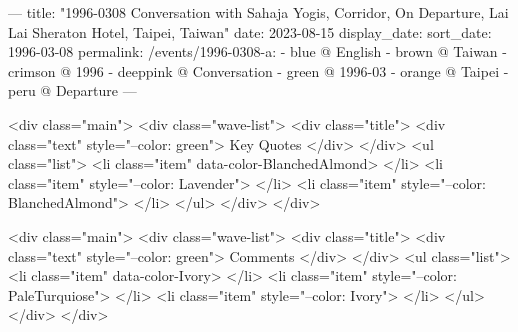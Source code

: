 ---
title: "1996-0308 Conversation with Sahaja Yogis, Corridor, On Departure, Lai Lai Sheraton Hotel, Taipei, Taiwan"
date: 2023-08-15
display_date: 
sort_date: 1996-03-08
permalink: /events/1996-0308-a:
  - blue @ English
  - brown @ Taiwan
  - crimson @ 1996
  - deeppink @ Conversation
  - green @ 1996-03 
  - orange @ Taipei
  - peru @ Departure
---

<div class="main">
  <div class="wave-list">
    <div class="title">
      <div class="text" style="--color: green">
        Key Quotes
      </div>
    </div>
    <ul class="list">
        <li class="item" data-color-BlanchedAlmond>
        </li>
        <li class="item" style="--color: Lavender">
        </li>
        <li class="item" style="--color: BlanchedAlmond">
        </li>
      </ul>
  </div>
</div>

<div class="main">
  <div class="wave-list">
    <div class="title">
      <div class="text" style="--color: green">
        Comments
      </div>
    </div>
    <ul class="list">
        <li class="item" data-color-Ivory>
        </li>
        <li class="item" style="--color: PaleTurquiose">
        </li>
        <li class="item" style="--color: Ivory">
        </li>
      </ul>
  </div>
</div>
